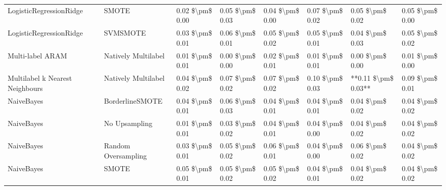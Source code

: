 \begin{tabular}{llllllll}
        LogisticRegressionRidge &                         SMOTE & 0.02 \$\textbackslash pm\$ 0.00 &           0.05 \$\textbackslash pm\$ 0.03 &       0.04 \$\textbackslash pm\$ 0.00 &        0.07 \$\textbackslash pm\$ 0.02 &                         0.05 \$\textbackslash pm\$ 0.02 &     0.05 \$\textbackslash pm\$ 0.00 \\
        LogisticRegressionRidge &                      SVMSMOTE & 0.03 \$\textbackslash pm\$ 0.01 &           0.06 \$\textbackslash pm\$ 0.01 &       0.05 \$\textbackslash pm\$ 0.02 &        0.05 \$\textbackslash pm\$ 0.01 &                         0.04 \$\textbackslash pm\$ 0.03 &     0.05 \$\textbackslash pm\$ 0.02 \\
               Multi-label ARAM &           Natively Multilabel & 0.01 \$\textbackslash pm\$ 0.01 &           0.00 \$\textbackslash pm\$ 0.00 &       0.02 \$\textbackslash pm\$ 0.01 &        0.01 \$\textbackslash pm\$ 0.01 &                         0.00 \$\textbackslash pm\$ 0.00 &     0.01 \$\textbackslash pm\$ 0.00 \\
Multilabel k Nearest Neighbours &           Natively Multilabel & 0.04 \$\textbackslash pm\$ 0.02 &           0.07 \$\textbackslash pm\$ 0.02 &       0.07 \$\textbackslash pm\$ 0.02 &        0.10 \$\textbackslash pm\$ 0.03 &                     **0.11 \$\textbackslash pm\$ 0.03** &     0.09 \$\textbackslash pm\$ 0.01 \\
                     NaiveBayes &               BorderlineSMOTE & 0.04 \$\textbackslash pm\$ 0.01 &           0.06 \$\textbackslash pm\$ 0.03 &       0.04 \$\textbackslash pm\$ 0.01 &        0.04 \$\textbackslash pm\$ 0.01 &                         0.04 \$\textbackslash pm\$ 0.02 &     0.04 \$\textbackslash pm\$ 0.02 \\
                     NaiveBayes &                 No Upsampling & 0.01 \$\textbackslash pm\$ 0.01 &           0.03 \$\textbackslash pm\$ 0.02 &       0.04 \$\textbackslash pm\$ 0.01 &        0.04 \$\textbackslash pm\$ 0.00 &                         0.04 \$\textbackslash pm\$ 0.02 &     0.04 \$\textbackslash pm\$ 0.02 \\
                     NaiveBayes &           Random Oversampling & 0.03 \$\textbackslash pm\$ 0.01 &           0.05 \$\textbackslash pm\$ 0.02 &       0.06 \$\textbackslash pm\$ 0.01 &        0.04 \$\textbackslash pm\$ 0.00 &                         0.06 \$\textbackslash pm\$ 0.02 &     0.04 \$\textbackslash pm\$ 0.02 \\
                     NaiveBayes &                         SMOTE & 0.05 \$\textbackslash pm\$ 0.01 &           0.05 \$\textbackslash pm\$ 0.02 &       0.05 \$\textbackslash pm\$ 0.02 &        0.04 \$\textbackslash pm\$ 0.01 &                         0.04 \$\textbackslash pm\$ 0.02 &     0.04 \$\textbackslash pm\$ 0.02 \\

\end{tabular}
